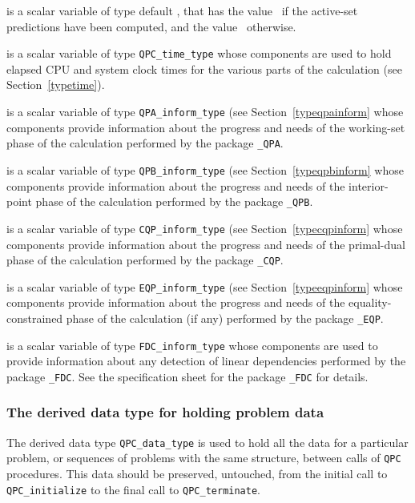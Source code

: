 \documentclass{galahad}
\newcommand{\packagename}{QPC}
\begin{document}
\begin{description}
 is a scalar variable of type default \logical, that has the
value \true\ if the active-set predictions have been computed,
and the value \false\ otherwise.

 is a scalar variable of type {\tt \packagename\_time\_type} 
whose components are used to hold elapsed CPU and system clock 
times for the various parts of the calculation (see Section~\ref{typetime}).

 is a scalar variable of type 
{\tt QPA\_inform\_type} (see Section~\ref{typeqpainform}
whose components provide information about the progress and needs
of the working-set phase of the calculation performed by the package 
{\tt \libraryname\_QPA}. 

 is a scalar variable of type 
{\tt QPB\_inform\_type} (see Section~\ref{typeqpbinform}
whose components provide information about the progress and needs
of the interior-point phase of the calculation performed by the package 
{\tt \libraryname\_QPB}. 

 is a scalar variable of type 
{\tt CQP\_inform\_type} (see Section~\ref{typecqpinform}
whose components provide information about the progress and needs
of the primal-dual phase of the calculation performed by the package 
{\tt \libraryname\_CQP}. 

 is a scalar variable of type 
{\tt EQP\_inform\_type} (see Section~\ref{typeeqpinform}
whose components provide information about the progress and needs
of the equality-constrained phase of the calculation (if any) 
performed by the package 
{\tt \libraryname\_EQP}. 

 is a scalar variable of type 
{\tt FDC\_inform\_type}
whose components are used to provide information about 
any detection of linear dependencies
performed by the package 
{\tt \libraryname\_FDC}. 
See the specification sheet for the package 
{\tt \libraryname\_FDC} for details.

\end{description}


\subsubsection{The derived data type for holding problem data}\label{typedata}
The derived data type 
{\tt \packagename\_data\_type} 
is used to hold all the data for a particular problem,
or sequences of problems with the same structure, between calls of 
{\tt \packagename} procedures. 
This data should be preserved, untouched, from the initial call to 
{\tt \packagename\_initialize}
to the final call to
{\tt \packagename\_terminate}.
\end{document}
